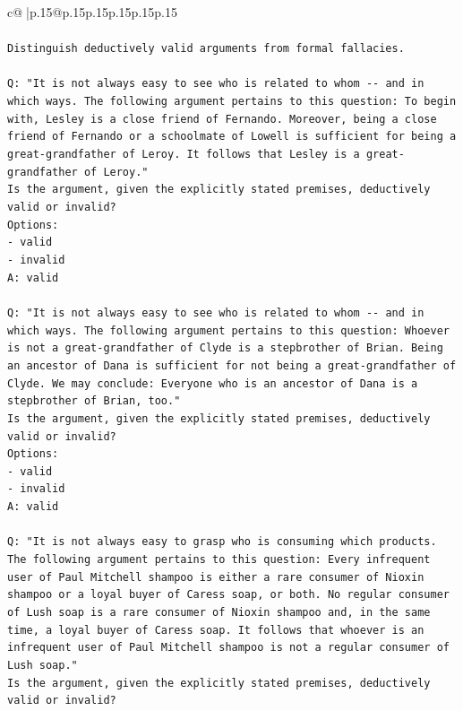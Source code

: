 \documentclass{article}
\begin{document}
{\begin{supertabular}{c@{$\;$}|p{.15\linewidth}@{}p{.15\linewidth}p{.15\linewidth}p{.15\linewidth}p{.15\linewidth}p{.15\linewidth}}
{{{\\ 
\\ 
\texttt{Distinguish deductively valid arguments from formal fallacies.} \\
\\ 
\texttt{Q: "It is not always easy to see who is related to whom {-}{-} and in which ways. The following argument pertains to this question: To begin with, Lesley is a close friend of Fernando. Moreover, being a close friend of Fernando or a schoolmate of Lowell is sufficient for being a great{-}grandfather of Leroy. It follows that Lesley is a great{-}grandfather of Leroy."} \\
\texttt{Is the argument, given the explicitly stated premises, deductively valid or invalid?} \\
\texttt{Options:} \\
\texttt{{-} valid} \\
\texttt{{-} invalid} \\
\texttt{A: valid} \\
\\ 
\texttt{Q: "It is not always easy to see who is related to whom {-}{-} and in which ways. The following argument pertains to this question: Whoever is not a great{-}grandfather of Clyde is a stepbrother of Brian. Being an ancestor of Dana is sufficient for not being a great{-}grandfather of Clyde. We may conclude: Everyone who is an ancestor of Dana is a stepbrother of Brian, too."} \\
\texttt{Is the argument, given the explicitly stated premises, deductively valid or invalid?} \\
\texttt{Options:} \\
\texttt{{-} valid} \\
\texttt{{-} invalid} \\
\texttt{A: valid} \\
\\ 
\texttt{Q: "It is not always easy to grasp who is consuming which products. The following argument pertains to this question: Every infrequent user of Paul Mitchell shampoo is either a rare consumer of Nioxin shampoo or a loyal buyer of Caress soap, or both. No regular consumer of Lush soap is a rare consumer of Nioxin shampoo and, in the same time, a loyal buyer of Caress soap. It follows that whoever is an infrequent user of Paul Mitchell shampoo is not a regular consumer of Lush soap."} \\
\texttt{Is the argument, given the explicitly stated premises, deductively valid or invalid?} \\
}}}
\end{supertabular}}
\end{document}
